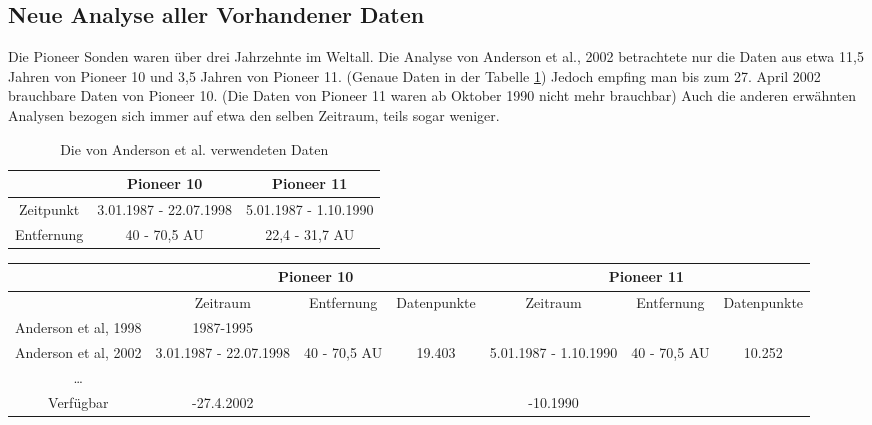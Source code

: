 \subsection{Neue Analyse aller Vorhandener Daten}
Die Pioneer Sonden waren über drei Jahrzehnte im Weltall. Die Analyse von Anderson et al., 2002 betrachtete nur die Daten aus etwa 11,5 Jahren von Pioneer 10 und 3,5 Jahren von Pioneer 11. (Genaue Daten in der Tabelle \ref{tab:andersondaten})
Jedoch empfing man bis zum 27. April 2002 brauchbare Daten von Pioneer 10. (Die Daten von Pioneer 11 waren ab Oktober 1990 nicht mehr brauchbar) Auch die anderen erwähnten Analysen bezogen sich immer auf etwa den selben Zeitraum, teils sogar weniger.

\begin{table}[h]
\centering
\begin{tabular}{|c|c|c|}
\hline & Pioneer 10 & Pioneer 11 \\ 
\hline Zeitpunkt & 3.01.1987 - 22.07.1998  & 5.01.1987 - 1.10.1990 \\ 
\hline Entfernung & 40 - 70,5 AU & 22,4 - 31,7 AU \\ 
\hline 
\end{tabular}
\caption{Die von Anderson et al. verwendeten Daten}
\label{tab:andersondaten}
\end{table}

 
\begin{sidewaystable}[hn]
\newcommand{\mc}[3]{\multicolumn{#1}{#2}{#3}}
\begin{tabular}{|c|c|c|c|c|c|c|}
\hline  & \mc{3}{c|}{Pioneer 10} & \mc{3}{c|}{Pioneer 11} \\
\hline  & Zeitraum & Entfernung & Datenpunkte & Zeitraum & Entfernung & Datenpunkte \\
\hline Anderson et al, 1998 & 1987-1995 &  &  &  &  &  \\
\hline Anderson et al, 2002 & 3.01.1987 - 22.07.1998 & 40 - 70,5 AU & 19.403 & 5.01.1987 - 1.10.1990 & 40 - 70,5 AU & 10.252 \\
\hline … &   &   &   &   &   &   \\
\hline Verfügbar & -27.4.2002 &  &  & -10.1990 &  &  \\
\hline 
\end{tabular}
\caption{Übersicht über die Verwendeten Daten in allen Analysen}
\label{tab:andersondaten}
\end{sidewaystable}


